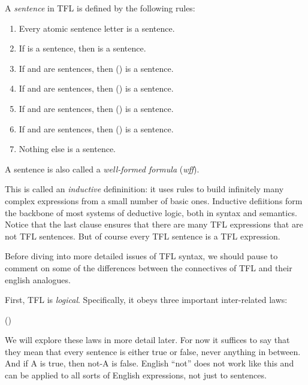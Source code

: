 \begin{definition}
  \label{def:tfl-sentence}
  A \emph{sentence} in TFL is defined by the following rules:
  \begin{enumerate}
  \item Every atomic sentence letter is a sentence.
  \item If \ephi is a sentence, then \enot\ephi is a sentence.
  \item If \ephi and \epsi are sentences, then (\ephi\eand\epsi) is a sentence.
  \item If \ephi and \epsi are sentences, then (\ephi\eor\epsi) is a sentence.
  \item If \ephi and \epsi are sentences, then (\ephi\eif\epsi) is a sentence.
  \item If \ephi and \epsi are sentences, then (\ephi\eiff\epsi) is a sentence.
  \item Nothing else is a sentence.
  \end{enumerate}
  A sentence is also called a \emph{well-formed formula} (\emph{wff}).
\end{definition}

This is called an \emph{inductive} defininition: it uses rules to build
infinitely many complex expressions from a small number of basic ones. Inductive
defiitions form the backbone of most systems of deductive logic, both in syntax
and semantics. Notice that the last clause ensures that there are many TFL
expressions that are not TFL sentences. But of course every TFL sentence is a
TFL expression.

Before diving into more detailed issues of TFL syntax, we should pause to
comment on some of the differences between the connectives of TFL and their
english analogues.

First, TFL \enot is \emph{logical}. Specifically, it obeys three important
inter-related laws:

\begin{argument}
\item[\textbf{LEM:}] \ephi\eor\enot\ephi
\item[\textbf{LNC:}] \enot(\ephi\eand\enot\ephi)
\item[\textbf{DN:}]  \enot\enot\ephi\eiff\ephi  
\end{argument}

We will explore these laws in more detail later. For now it suffices to say that
they mean that every sentence is either true or false, never anything in
between. And if A is true, then not-A is false. English ``not'' does not work
like this and can be applied to all sorts of English expressions, not just to
sentences.

